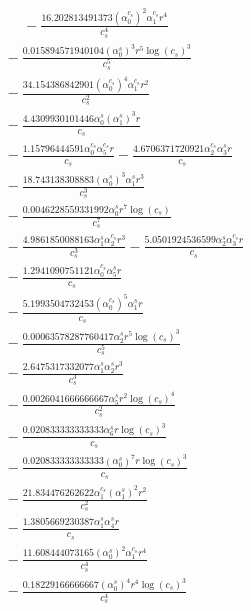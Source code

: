 \documentclass[10pt]{article}
\begin{document}
\begin{align*}
\phantom{R_{3,8}} &\phantom{={}}{}  - \frac{16.202813491373 \left(\alpha_{0}^{c_s}\right)^{2} \alpha_{1}^{c_s} r^{4}}{c_{s}^{4}} \\
&{}  - \frac{0.015894571940104 \left(\alpha_{0}^s\right)^{3} r^{5} \log{\left(c_{s} \right)}^{3}}{c_{s}^{5}} \\
&{}  - \frac{34.154386842901 \left(\alpha_{0}^{c_s}\right)^{4} \alpha_{1}^{c_s} r^{2}}{c_{s}^{2}} \\
&{}  - \frac{4.4309930101446 \alpha_{0}^s \left(\alpha_{1}^s\right)^{3} r}{c_{s}} \\
&{}  - \frac{1.15796444591 \alpha_{0}^{c_s} \alpha_{5}^{c_s} r}{c_{s}} - \frac{4.6706371720921 \alpha_{2}^{c_s} \alpha_{3}^s r}{c_{s}} \\
&{}  - \frac{18.743138308883 \left(\alpha_{0}^s\right)^{3} \alpha_{1}^s r^{3}}{c_{s}^{3}} \\
&{}  - \frac{0.0046228559331992 \alpha_{0}^s r^{7} \log{\left(c_{s} \right)}}{c_{s}^{7}} \\
&{}  - \frac{4.9861850088163 \alpha_{1}^s \alpha_{2}^{c_s} r^{3}}{c_{s}^{3}} - \frac{5.0501924536599 \alpha_{2}^s \alpha_{3}^{c_s} r}{c_{s}} \\
&{}  - \frac{1.2941090751121 \alpha_{0}^{c_s} \alpha_{5}^s r}{c_{s}} \\
&{}  - \frac{5.1993504732453 \left(\alpha_{0}^{c_s}\right)^{5} \alpha_{1}^s r}{c_{s}} \\
&{}  - \frac{0.00063578287760417 \alpha_{2}^s r^{5} \log{\left(c_{s} \right)}^{3}}{c_{s}^{5}} \\
&{}  - \frac{2.6475317332077 \alpha_{1}^s \alpha_{2}^s r^{3}}{c_{s}^{3}} \\
&{}  - \frac{0.0026041666666667 \alpha_{5}^s r^{2} \log{\left(c_{s} \right)}^{4}}{c_{s}^{2}} \\
&{}  - \frac{0.020833333333333 \alpha_{6}^s r \log{\left(c_{s} \right)}^{3}}{c_{s}} \\
&{}  - \frac{0.020833333333333 \left(\alpha_{0}^s\right)^{7} r \log{\left(c_{s} \right)}^{3}}{c_{s}} \\
&{}  - \frac{21.834476262622 \alpha_{1}^{c_s} \left(\alpha_{1}^s\right)^{2} r^{2}}{c_{s}^{2}} \\
&{}  - \frac{1.3805669230387 \alpha_{1}^s \alpha_{4}^s r}{c_{s}} \\
&{}  - \frac{11.608444073165 \left(\alpha_{0}^s\right)^{2} \alpha_{1}^{c_s} r^{4}}{c_{s}^{4}} \\
&{}  - \frac{0.18229166666667 \left(\alpha_{0}^s\right)^{4} r^{4} \log{\left(c_{s} \right)}^{3}}{c_{s}^{4}} \\

\end{align*}
\end{document}
